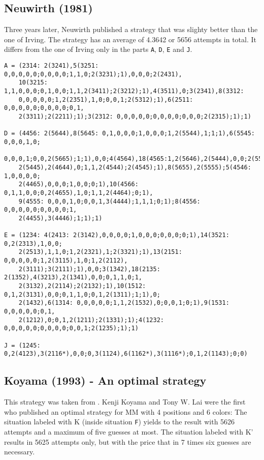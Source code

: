 \subsection{Neuwirth (1981)}
Three years later, Neuwirth published a strategy that was slighty better
than the one of Irving. The strategy has an average of
4.3642 or 5656 attempts in total. It differs from the one of Irving only in the
parts \texttt{A}, \texttt{D}, \texttt{E} and \texttt{J}. 

\scriptsize
\begin{verbatim}
A = (2314: 2(3241),5(3251: 0,0,0,0,0;0,0,0,0;1,1,0;2(3231);1),0,0,0;2(2431),
    10(3215: 1,1,0,0,0;0,1,0,0;1,1,2(3411);2(3212);1),4(3511),0;3(2341),8(3312:
    0,0,0,0,0;1,2(2351),1,0;0,0,1;2(5312);1),6(2511: 0,0,0,0,0;0,0,0,0;0,1,
    2(3311);2(2211);1);3(2312: 0,0,0,0,0;0,0,0,0;0,0,0;2(2315);1);1)

D = (4456: 2(5644),8(5645: 0,1,0,0,0;1,0,0,0;1,2(5544),1;1;1),6(5545: 0,0,0,1,0;
    0,0,0,1;0,0,2(5665);1;1),0,0;4(4564),18(4565:1,2(5646),2(5444),0,0;2(5546),
    2(5445),2(4644),0;1,1,2(4544);2(4545);1),8(5655),2(5555);5(4546: 1,0,0,0,0;
    2(4465),0,0,0;1,0,0;0;1),10(4566: 0,1,1,0,0;0,2(4655),1,0;1,1,2(4464);0;1),
    9(4555: 0,0,0,1,0;0,0,1,3(4444);1,1,1;0;1);8(4556: 0,0,0,0,0;0,0,0,0;1,
    2(4455),3(4446);1;1);1)

E = (1234: 4(2413: 2(3142),0,0,0,0;1,0,0,0;0,0,0;0;1),14(3521: 0,2(2313),1,0,0;
    2(2513),1,1,0;1,2(2321),1;2(3321);1),13(2151: 0,0,0,0,0;1,2(3115),1,0;1,2(2112),
    2(3111);3(2111);1),0,0;3(1342),18(2135: 2(1352),4(3213),2(1341),0,0;0,1,1,0;1,
    2(3132),2(2114);2(2132);1),10(1512: 0,1,2(3131),0,0;0,1,1,0;0,1,2(1311);1;1),0;
    2(1432),6(1314: 0,0,0,0,0;1,1,2(1532),0;0,0,1;0;1),9(1531: 0,0,0,0,0;0,1,
    2(1212),0;0,1,2(1211);2(1331);1);4(1232: 0,0,0,0,0;0,0,0,0;0,0,1;2(1235);1);1)

J = (1245: 0,2(4123),3(2116*),0,0;0,3(1124),6(1162*),3(1116*);0,1,2(1143);0;0)
\end{verbatim}
\normalsize

\subsection{Koyama (1993) - An optimal strategy}
This strategy was taken from \cite{KOYAMA94}. Kenji Koyama and Tony W. Lai were the first who
published an optimal strategy for MM with 4 positions and 6 colors:
The situation labeled with K (inside situation \texttt{F}) yields to the result with 5626 attempts and a maximum of five guesses at most.
The situation labeled with K' results in 5625 attempts only, but with the price that in 7 times six guesses are necessary.

